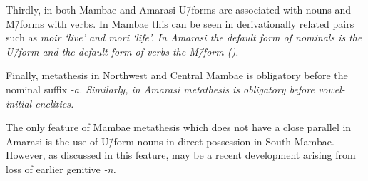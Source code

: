 Thirdly, in both Mambae and Amarasi U\=/forms are associated
with nouns and M\=/forms with verbs.
In Mambae this can be seen in derivationally
related pairs such as \it{moir} `live' and \it{mori} `life'.
In Amarasi the default form of nominals is the U\=/form
and the default form of verbs the M\=/form ().

Finally, metathesis in Northwest and Central Mambae
is obligatory before the nominal suffix \it{-a}.
Similarly, in Amarasi metathesis is obligatory before
vowel-initial enclitics.

The only feature of Mambae metathesis which does
not have a close parallel in Amarasi is the use
of U\=/form nouns in direct possession in South Mambae.
However, as discussed in  this feature,
may be a recent development arising from loss
of earlier genitive \it{-n}.
